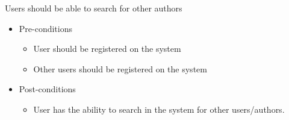 \documentclass[a4paper,12pt]{report}
\begin{document}
	Users should be able to search for other authors
	\begin{itemize}
		\item Pre-conditions
			\begin{itemize}
				\item User should be registered on the system
				\item Other users should be registered on the system
			\end{itemize}
		\item Post-conditions
			\begin{itemize}
				\item User has the ability to search in the system for other users/authors.
			\end{itemize}
	\end{itemize}

\newpage
\end{document}
